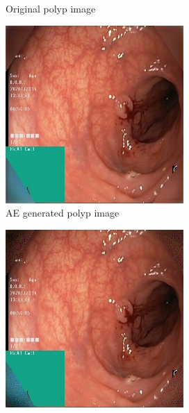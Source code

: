 \begin{figure}
\begin{subfigure}[t]{\myfigsizethree}
            \caption{ Original polyp image }   
            \label{fig:z_ORIG_CORNER2}
        \end{subfigure}
        \qquad
        \begin{subfigure}[t]{\myfigsizethree}   
            \centering 
            \includegraphics[width=\textwidth]{experiments/figures/blackcorner/polypwithgreenAE.jpg}
            \caption{AE generated polyp image }   
            \label{fig:z_AE_CORNER2}
        \end{subfigure}
        \qquad%
        \begin{subfigure}[t]{\myfigsizethree}   
            \centering 
            \includegraphics[width=\textwidth]{experiments/figures/blackcorner/polypwithgreenGAN.jpg}

\end{subfigure}
\end{figure}
